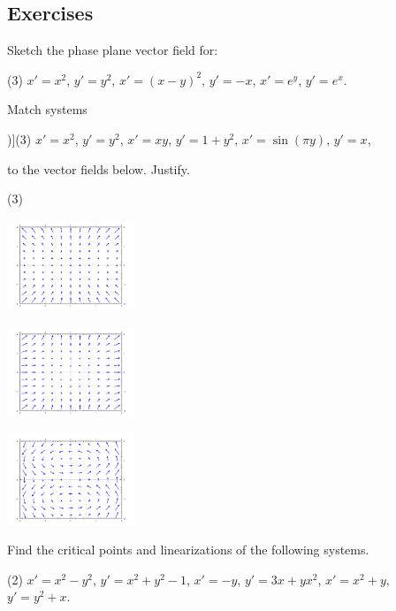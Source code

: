 \subsection{Exercises}

\begin{exercise}
Sketch the phase plane vector field for:
\begin{tasks}(3)
\task $x'=x^2$, \enspace $y'=y^2$,
\task $x'=(x-y)^2$, \enspace $y'=-x$,
\task $x'=e^y$, \enspace $y'=e^x$.
\end{tasks}
\end{exercise}

\begin{samepage}
\begin{exercise}
Match systems
\begin{tasks}[counter-format=tsk[1])](3)
\task $x'=x^2$, \enspace $y'=y^2$,
\task $x'=xy$, \enspace $y'=1+y^2$,
\task $x'=\sin(\pi y)$, \enspace $y'=x$,
\end{tasks}
to the vector fields below.  Justify.
\begin{tasks}(3)
\task
\parbox[c]{1.6in}{\includegraphics[width=1.5in]{figures/nlin-exer-xy-1py2}}
\task
\parbox[c]{1.6in}{\includegraphics[width=1.5in]{figures/nlin-exer-x2-y2}}
\task
\parbox[c]{1.6in}{\includegraphics[width=1.5in]{figures/nlin-exer-sinpiy-x}}
\end{tasks}
\end{exercise}
\end{samepage}


\begin{exercise}
Find the critical points and linearizations of the following systems.
\begin{tasks}(2)
\task $x'=x^2-y^2$, \enspace $y'=x^2+y^2-1$,
\task $x'=-y$, \enspace $y'=3x+yx^2$,
\task $x'=x^2+y$, \enspace $y'=y^2+x$.
\end{tasks}
\end{exercise}

